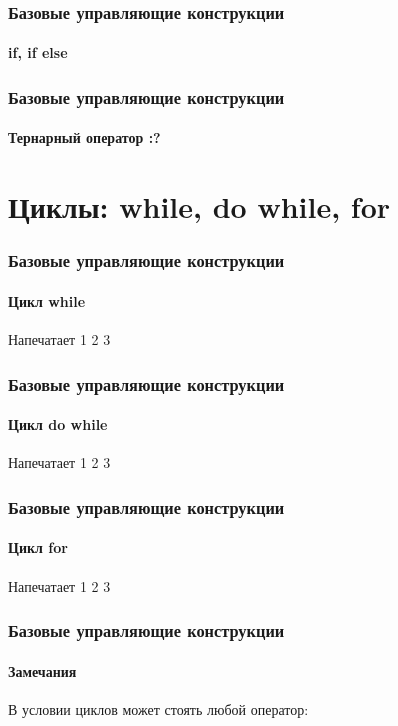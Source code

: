 \documentclass[12pt,pdf,hyperref={unicode}]{beamer}
\begin{document}
\begin{frame}[fragile]
\frametitle{Базовые управляющие конструкции} 
\framesubtitle{if, if else}



\end{frame}


\begin{frame}
\frametitle{Базовые управляющие конструкции} 
\framesubtitle{Тернарный оператор :?}


\end{frame}



\section{Циклы: while, do while, for}


\begin{frame}
\frametitle{Базовые управляющие конструкции} 
\framesubtitle{Цикл while}



Напечатает 1 2 3 

\end{frame}

\begin{frame}
\frametitle{Базовые управляющие конструкции} 
\framesubtitle{Цикл do while}



Напечатает 1 2 3 

\end{frame}

\begin{frame}
\frametitle{Базовые управляющие конструкции} 
\framesubtitle{Цикл for}



Напечатает 1 2 3 

\end{frame}

\begin{frame}
\frametitle{Базовые управляющие конструкции} 
\framesubtitle{Замечания}

В условии циклов может стоять любой оператор:




\end{frame}
\end{document}
